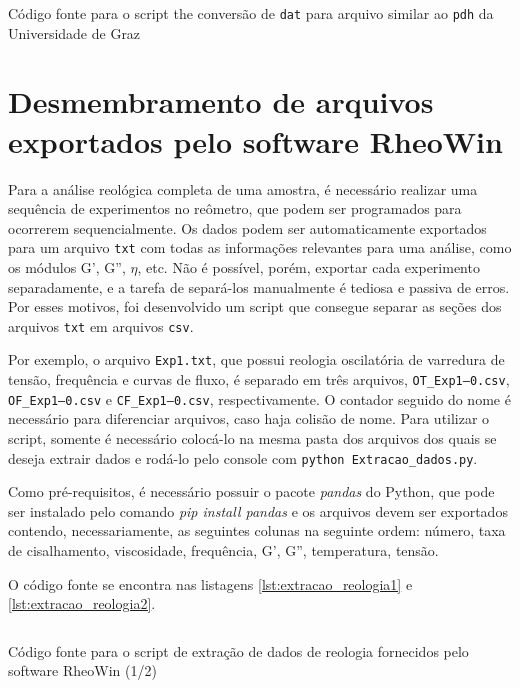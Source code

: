 \begin{apendicesenv}
\begin{listing}[H]
	\inputminted{python}{./python/LNLS_dat_to_pdh.py}
	\caption{Código fonte para o script the conversão de \texttt{dat} para arquivo similar ao \texttt{pdh} da Universidade de Graz}  %
	\label{lst:LNLS_pdh}
\end{listing}

\section{Desmembramento de arquivos exportados pelo software \mbox{RheoWin}}

Para a análise reológica completa de uma amostra, é necessário realizar uma sequência de experimentos no reômetro, que podem ser programados para ocorrerem sequencialmente. Os dados podem ser automaticamente exportados para um arquivo \texttt{txt} com todas as informações relevantes para uma análise, como os módulos G', G'', \(\eta\), etc. Não é possível, porém, exportar cada experimento separadamente, e a tarefa de separá-los manualmente é tediosa e passiva de erros. Por esses motivos, foi desenvolvido um script que consegue separar as seções dos arquivos \texttt{txt} em arquivos \texttt{csv}.

Por exemplo, o arquivo \texttt{Exp1.txt}, que possui reologia oscilatória de varredura de tensão, frequência e curvas de fluxo, é separado em três arquivos, \texttt{OT\_Exp1--0.csv}, \texttt{OF\_Exp1--0.csv} e \texttt{CF\_Exp1--0.csv}, respectivamente. O contador seguido do nome é necessário para diferenciar arquivos, caso haja colisão de nome. Para utilizar o script, somente é necessário colocá-lo na mesma pasta dos arquivos dos quais se deseja extrair dados e rodá-lo pelo console com \texttt{python Extracao\_dados.py}.

Como pré-requisitos, é necessário possuir o pacote \emph{pandas} do Python, que pode ser instalado pelo comando \emph{pip install pandas} e os arquivos devem ser exportados contendo, necessariamente, as seguintes colunas na seguinte ordem: número, taxa de cisalhamento, viscosidade, frequência, G', G'', temperatura, tensão.

O código fonte se encontra nas listagens \ref{lst:extracao_reologia1} e \ref{lst:extracao_reologia2}.

\begin{listing}[H]
	\inputminted{python}{./python/extracao_reologia1.py}
	\caption{Código fonte para o script de extração de dados de reologia fornecidos pelo software RheoWin (1/2)}  
	\label{lst:extracao_reologia1}
\end{listing}


\end{apendicesenv}
